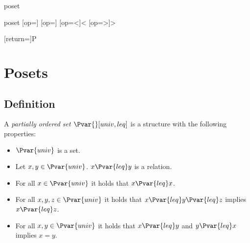 \documentclass{stex}
\begin{document}
\begin{smodule}{poset}
  \STEXexport{
    \let\oldleq\leq
    \let\leq\relax
    \let\oldgeq\geq
    \let\geq\relax
  }

  \begin{mathstructure}{poset}
    [op=\oldleq]{\;\oldleq\;}
    [op=\oldgeq]{\;\oldgeq\;}
    [op=<]{\;<\;}
    [op=>]{\;>\;}
  \end{mathstructure}

  [return={\poset[comp=##1]}]{\mathcal P}

  \section{Posets}

  \begin{forthel}     
  \end{forthel}

  \subsection{Definition}
  
  \begin{forthel}
    \begin{signature*}
      A \emph{partially ordered set $\Pvar{}[univ,leq]$} is a structure with the following properties:
      \begin{itemize}
        \item \label{postUnivSig}
          $\Pvar{univ}$ is a set.

        \item \label{posetLeqSig}
          Let $x, y \in \Pvar{univ}$. $x {\Pvar{leq}} y$ is a relation.

        \item \label{posetReflAx}
          For all $x \in \Pvar{univ}$ it holds that $x {\Pvar{leq}} x$.

        \item \label{posetTransAx}
          For all $x, y, z \in \Pvar{univ}$ it holds that $x {\Pvar{leq}} y {\Pvar{leq}} z$ implies $x {\Pvar{leq}} z$.

        \item \label{posetAntisymAx}
          For all $x, y \in \Pvar{univ}$ it holds that $x {\Pvar{leq}} y$ and $y {\Pvar{leq}} x$ implies $x=y$.
      \end{itemize}
    \end{signature*}


\end{forthel}
\end{smodule}
\end{document}
